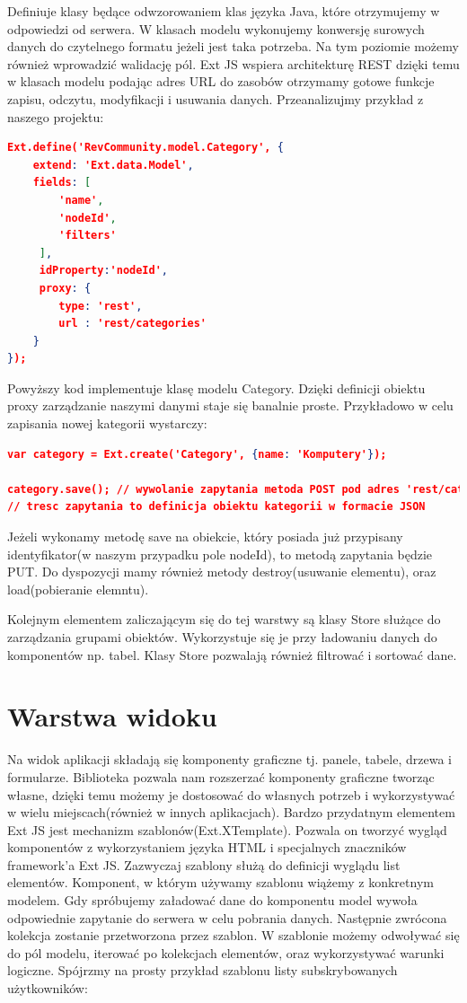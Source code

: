 Definiuje klasy będące odwzorowaniem klas języka Java, które otrzymujemy w odpowiedzi od serwera. W klasach modelu wykonujemy konwersję surowych danych do czytelnego formatu jeżeli jest taka potrzeba. Na tym poziomie możemy również wprowadzić walidację pól. Ext JS wspiera architekturę REST dzięki temu w klasach modelu podając adres URL do zasobów otrzymamy gotowe funkcje zapisu, odczytu, modyfikacji i usuwania danych. Przeanalizujmy przykład z naszego projektu:
\begin{lstlisting}[language=json]
Ext.define('RevCommunity.model.Category', {
    extend: 'Ext.data.Model',
    fields: [
		'name',
		'nodeId',
		'filters'
	 ],
     idProperty:'nodeId',
     proxy: {
        type: 'rest',
        url : 'rest/categories'
    }
});
\end{lstlisting}

Powyższy kod implementuje klasę modelu Category. Dzięki definicji obiektu proxy zarządzanie naszymi danymi staje się banalnie proste. Przykładowo w celu zapisania nowej kategorii wystarczy:

\begin{lstlisting}[language=json]
var category = Ext.create('Category', {name: 'Komputery'});

category.save(); // wywolanie zapytania metoda POST pod adres 'rest/categories'
// tresc zapytania to definicja obiektu kategorii w formacie JSON
\end{lstlisting}

Jeżeli wykonamy metodę save na obiekcie, który posiada już przypisany identyfikator(w naszym przypadku pole nodeId), to metodą zapytania będzie PUT.
Do dyspozycji mamy również metody destroy(usuwanie elementu), oraz load(pobieranie elemntu).

Kolejnym elementem zaliczającym się do tej warstwy są klasy Store służące do zarządzania grupami obiektów. Wykorzystuje się je przy ładowaniu danych do komponentów np. tabel. 
Klasy Store pozwalają również filtrować i sortować dane.

\section{Warstwa widoku}

Na widok aplikacji składają się komponenty graficzne tj. panele, tabele, drzewa i formularze. Biblioteka pozwala nam rozszerzać komponenty graficzne tworząc własne, dzięki temu możemy je dostosować do własnych potrzeb i wykorzystywać w wielu miejscach(również w innych aplikacjach). Bardzo przydatnym elementem Ext JS jest mechanizm szablonów(Ext.XTemplate). Pozwala on tworzyć wygląd komponentów z wykorzystaniem języka HTML i specjalnych znaczników framework'a Ext JS. Zazwyczaj szablony służą do definicji wyglądu list elementów. Komponent, w którym używamy szablonu wiążemy z konkretnym modelem. Gdy spróbujemy załadować dane do komponentu model wywoła odpowiednie zapytanie do serwera w celu pobrania danych. Następnie zwrócona kolekcja zostanie przetworzona przez szablon. W szablonie możemy odwoływać się do pól modelu, iterować po kolekcjach elementów, oraz wykorzystywać warunki logiczne. Spójrzmy na prosty przykład szablonu listy subskrybowanych użytkowników:
 
